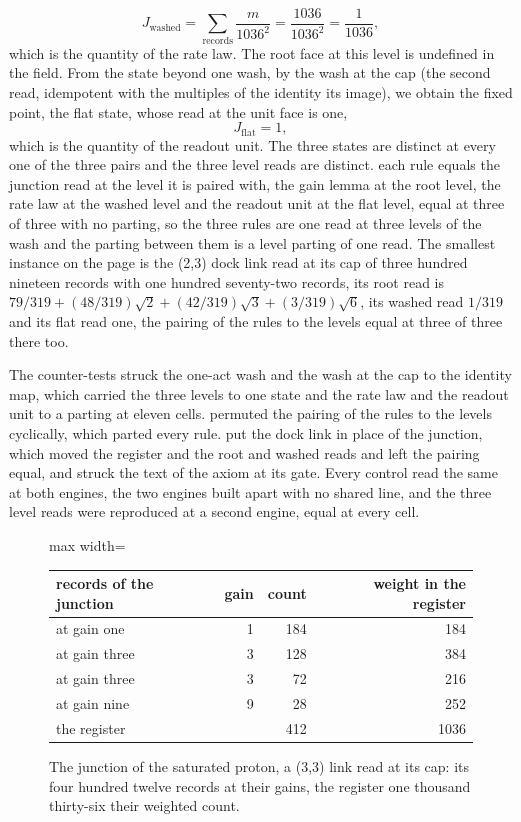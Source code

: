 \begin{chproof}[exact]
\begin{equation}
J_{\mathrm{washed}} = \sum_{\text{records}} \frac{m}{1036^{2}} = \frac{1036}{1036^{2}} = \frac{1}{1036} ,
\end{equation}
which is the quantity of the rate law. The root face at this level is undefined in the field. From the state beyond one wash, by the wash at the cap (the second read, idempotent with the multiples of the identity its image), we obtain the fixed point, the flat state, whose read at the unit face is one,
\begin{equation}
J_{\mathrm{flat}} = 1 ,
\end{equation}
which is the quantity of the readout unit. The three states are distinct at every one of the three pairs and the three level reads are distinct. each rule equals the junction read at the level it is paired with, the gain lemma at the root level, the rate law at the washed level and the readout unit at the flat level, equal at three of three with no parting, so the three rules are one read at three levels of the wash and the parting between them is a level parting of one read. The smallest instance on the page is the (2,3) dock link read at its cap of three hundred nineteen records with one hundred seventy-two records, its root read is $79/319 + (48/319)\sqrt{2} + (42/319)\sqrt{3} + (3/319)\sqrt{6}$, its washed read $1/319$ and its flat read one, the pairing of the rules to the levels equal at three of three there too.

The counter-tests struck the one-act wash and the wash at the cap to the identity map, which carried the three levels to one state and the rate law and the readout unit to a parting at eleven cells. permuted the pairing of the rules to the levels cyclically, which parted every rule. put the dock link in place of the junction, which moved the register and the root and washed reads and left the pairing equal, and struck the text of the axiom at its gate. Every control read the same at both engines, the two engines built apart with no shared line, and the three level reads were reproduced at a second engine, equal at every cell.
\end{chproof}
\begin{figure}[h]\centering
\begin{adjustbox}{max width=\linewidth}\begin{tabular}{lrrr}\toprule
records of the junction & gain & count & weight in the register \\ \midrule
at gain one & 1 & 184 & 184 \\
at gain three & 3 & 128 & 384 \\
at gain three & 3 & 72 & 216 \\
at gain nine & 9 & 28 & 252 \\ \midrule
the register & & 412 & 1036 \\ \bottomrule
\end{tabular}\end{adjustbox}
\caption{The junction of the saturated proton, a (3,3) link read at its cap: its four hundred twelve records at their gains, the register one thousand thirty-six their weighted count.}
\end{figure}
